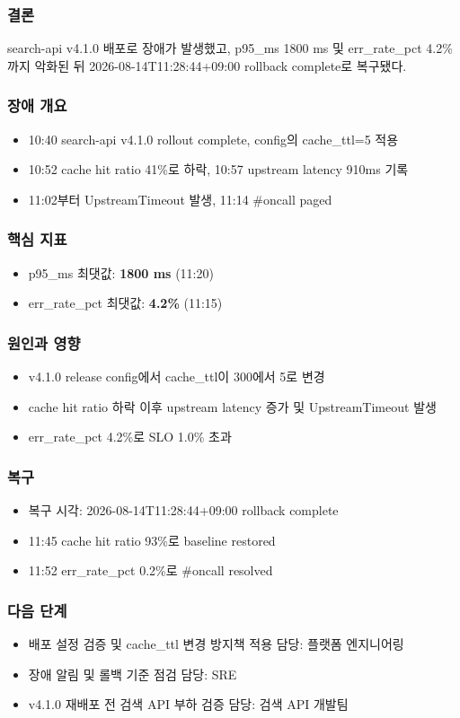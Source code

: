 \documentclass[aspectratio=169]{beamer}
\begin{document}
\begin{frame}
\frametitle{결론}
\centering
\Large search-api v4.1.0 배포로 장애가 발생했고, p95\_ms 1800 ms 및 err\_rate\_pct 4.2\%까지 악화된 뒤 2026-08-14T11:28:44+09:00 rollback complete로 복구됐다.
\end{frame}

\begin{frame}
\frametitle{장애 개요}
\begin{itemize}
  \item 10:40 search-api v4.1.0 rollout complete, config의 cache\_ttl=5 적용
  \item 10:52 cache hit ratio 41\%로 하락, 10:57 upstream latency 910ms 기록
  \item 11:02부터 UpstreamTimeout 발생, 11:14 \#oncall paged
\end{itemize}
\end{frame}

\begin{frame}
\frametitle{핵심 지표}
\begin{itemize}
  \item p95\_ms 최댓값: \textbf{1800 ms} (11:20)
  \item err\_rate\_pct 최댓값: \textbf{4.2\%} (11:15)
\end{itemize}
\end{frame}

\begin{frame}
\frametitle{원인과 영향}
\begin{itemize}
  \item v4.1.0 release config에서 cache\_ttl이 300에서 5로 변경
  \item cache hit ratio 하락 이후 upstream latency 증가 및 UpstreamTimeout 발생
  \item err\_rate\_pct 4.2\%로 SLO 1.0\% 초과
\end{itemize}
\end{frame}

\begin{frame}
\frametitle{복구}
\begin{itemize}
  \item 복구 시각: 2026-08-14T11:28:44+09:00 rollback complete
  \item 11:45 cache hit ratio 93\%로 baseline restored
  \item 11:52 err\_rate\_pct 0.2\%로 \#oncall resolved
\end{itemize}
\end{frame}

\begin{frame}
\frametitle{다음 단계}
\begin{itemize}
  \item 배포 설정 검증 및 cache\_ttl 변경 방지책 적용 담당: 플랫폼 엔지니어링
  \item 장애 알림 및 롤백 기준 점검 담당: SRE
  \item v4.1.0 재배포 전 검색 API 부하 검증 담당: 검색 API 개발팀
\end{itemize}
\end{frame}
\end{document}
